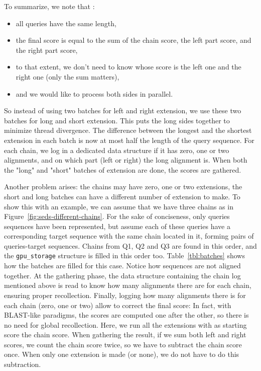 To summarize, we note that :
\begin{itemize}
	\item all queries have the same length,
	\item the final score is equal to the sum of the chain score, the left part score, and the right part score,
	\item to that extent, we don't need to know whose score is the left one and the right one (only the sum matters),
	\item and we would like to process both sides in parallel.
\end{itemize}

So instead of using two batches for left and right extension, we use these two batches for long and short extension. This puts the long sides together to minimize thread divergence. The difference between the longest and the shortest extension in each batch is now at most half the length of the query sequence. For each chain, we log in a dedicated data structure if it has zero, one or two alignments, and on which part (left or right) the long alignment is. When both the "long" and "short" batches of extension are done, the scores are gathered.

Another problem arises: the chains may have zero, one or two extensions, the short and long batches can have a different number of extension to make. To show this with an example, we can assume that we have three chains as in Figure~\ref{fig:seds-different-chains}. For the sake of conciseness, only queries sequences have been represented, but assume each of these queries have a corresponding target sequence with the same chain located in it, forming pairs of queries-target sequences. Chains from Q1, Q2 and Q3 are found in this order, and the \verb|gpu_storage| structure is filled in this order too. Table~\ref{tbl:batches} shows how the batches are filled for this case. Notice how sequences are not aligned together. At the gathering phase, the data structure containing the chain log mentioned above is read to know how many alignments there are for each chain, ensuring proper recollection. Finally, logging how many alignments there is for each chain (zero, one or two) allow to correct the final score: In fact, with BLAST-like paradigms, the scores are computed one after the other, so there is no need for global recollection. Here, we run all the extensions with as starting score the chain score. When gathering the result, if we sum both left and right scores, we count the chain score twice, so we have to subtract the chain score once. When only one extension is made (or none), we do not have to do this subtraction.

